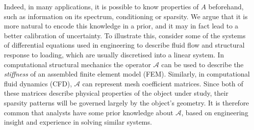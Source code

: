 \documentclass[twoside]{article}
\begin{document}
		Indeed, in many applications, it is possible to know properties of $A$ beforehand, such as information on its spectrum, conditioning or sparsity. We argue that it is more natural to encode this knowledge in a prior, and it may in fact lead to a better calibration of uncertainty. To illustrate this, consider some of the systems of differential equations used in engineering to describe fluid flow and structural response to loading, which are usually discretised into a linear system. %
		In computational structural mechanics the operator $\mathcal{A}$ can be used to describe the \textit{stiffness} of an assembled finite element model (FEM). Similarly, in computational fluid dynamics (CFD), $\mathcal{A}$ can represent mesh coefficient matrices. Since both of these matrices describe physical properties of the object under study, their sparsity patterns will be governed largely by the object's geometry. It is therefore common that analysts have some prior knowledge about $\mathcal{A}$, based on engineering insight and experience in solving similar systems.
		
\end{document}
